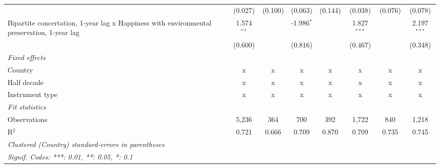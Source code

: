\begin{table}[htbp]
\begin{tabular}{lccccccc}
                                                                                                 & (0.027)        & (0.100)                   & (0.063)        & (0.144)          & (0.038)         & (0.076)         & (0.078)\\   
      Bipartite concertation, 1-year lag x Happiness with environmental preservation, 1-year lag & 1.574$^{**}$   &                           & -1.986$^{*}$   &                  & 1.827$^{***}$   &                 & 2.197$^{***}$\\   
                                                                                                 & (0.600)        &                           & (0.816)        &                  & (0.467)         &                 & (0.348)\\   
      \emph{Fixed effects}\\
      Country                                                                                    & x              & x                         & x              & x                & x               & x               & x\\  
      Half decade                                                                                & x              & x                         & x              & x                & x               & x               & x\\  
      Instrument type                                                                            & x              & x                         & x              & x                & x               & x               & x\\  
      \midrule \emph{Fit statistics}\\
      Observations                                                                               & 5,236          & 364                       & 700            & 392              & 1,722           & 840             & 1,218\\  
      R$^2$                                                                                      & 0.721          & 0.666                     & 0.709          & 0.870            & 0.709           & 0.735           & 0.745\\  
      \midrule
      \multicolumn{8}{l}{\emph{Clustered (Country) standard-errors in parentheses}}\\
      \multicolumn{8}{l}{\emph{Signif. Codes: ***: 0.01, **: 0.05, *: 0.1}}\\
   \end{tabular}
\end{table}


